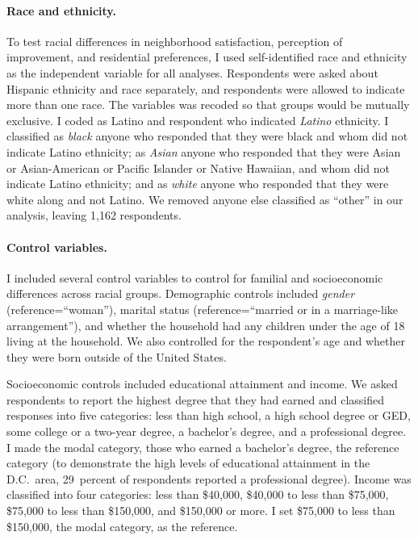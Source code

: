 \documentclass[11pt]{baderart}
\begin{document}
\paragraph{Race and ethnicity.} To test racial differences in neighborhood satisfaction, perception of improvement, and residential preferences, I used self-identified race and ethnicity as the independent variable for all analyses. Respondents were asked about Hispanic ethnicity and race separately, and respondents were allowed to indicate more than one race. The variables was recoded so that groups would be mutually exclusive. I coded as Latino and respondent who indicated \emph{Latino} ethnicity. I classified as \emph{black} anyone who responded that they were black and whom did not indicate Latino ethnicity; as \emph{Asian} anyone who responded that they were Asian or Asian-American or Pacific Islander or Native Hawaiian, and whom did not indicate Latino ethnicity; and as \emph{white} anyone who responded that they were white along and not Latino. We removed anyone else classified as ``other'' in our analysis, leaving 1,162 respondents. 

\paragraph{Control variables.} I included several control variables to control for familial and socioeconomic differences across racial groups. Demographic controls included \emph{gender} (reference=``woman''), marital status (reference=``married or in a marriage-like arrangement''), and whether the household had any children under the age of 18 living at the household. We also controlled for the respondent's age  and whether they were born outside of the United States. 

Socioeconomic controls included educational attainment and income. We asked respondents to report the highest degree that they had earned and classified responses into five categories: less than high school, a high school degree or GED, some college or a two-year degree, a bachelor's degree, and a professional degree. I made the modal category, those who earned a bachelor's degree, the reference category (to demonstrate the high levels of educational attainment in the D.C.\ area, 29~percent of respondents reported a professional degree). Income was classified into four categories: less than \$40,000, \$40,000 to less than \$75,000, \$75,000 to less than \$150,000, and \$150,000 or more. I set \$75,000 to less than \$150,000, the modal category, as the reference. 
\end{document}
